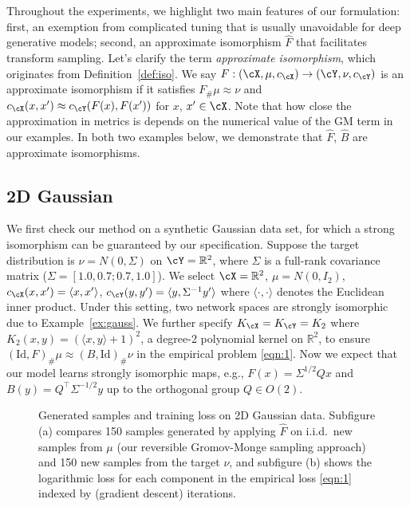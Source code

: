\documentclass[11pt]{article}
\begin{document}
Throughout the experiments, we highlight two main features of our formulation: first, an exemption from complicated tuning that is usually unavoidable for deep generative models; second, an approximate isomorphism  $\widehat{F}$ that facilitates transform sampling. Let's clarify the term \textit{approximate isomorphism}, which originates from Definition~\ref{def:iso}.
We say ${F}: (\cX, \mu, c_\cX) \to (\cY, \nu, c_\cY)$ is an approximate isomorphism if it
satisfies ${F}_\#\mu\approx \nu$ and
$c_\cX(x, x^\prime)\approx c_\cY({F}(x), {F}(x^\prime))$ for $x$, $x^\prime\in\cX$. 
Note that how close the approximation in metrics is depends on the numerical value of the GM term in our examples.
In both two examples below, we demonstrate that $\widehat{F}$, $\widehat{B}$ are approximate isomorphisms. 



\subsection{2D Gaussian}

We first check our method on a synthetic Gaussian data set, for which a strong isomorphism can be guaranteed by our specification. Suppose
the target distribution is $\nu = N(0, \Sigma)$ on $\cY = \mathbb{R}^2$, where $\Sigma$ is a full-rank covariance matrix ($\Sigma = [1.0, 0.7;0.7, 1.0]$).
We select
$\cX = \mathbb{R}^2$, $\mu = N(0, I_2)$,
$c_\cX(x, x^\prime) = \langle x, x^\prime\rangle$,
$c_\cY(y, y^\prime) =  \langle y, \Sigma^{-1} y^\prime\rangle$
where $\langle\cdot, \cdot\rangle$ denotes the Euclidean inner product. 
Under this setting, two network spaces are strongly isomorphic due to Example~\ref{ex:gauss}. 
We further specify $K_\cX = K_\cY = K_2$
where $K_2(x, y) = (\langle x, y\rangle + 1)^2$, a degree-2 polynomial kernel on $\mathbb{R}^2$, to ensure
$(\mathrm{Id}, F)_{\#}\mu \approx (B, \mathrm{Id})_{\#} \nu$ in the
empirical problem \eqref{eqn:1}. 
Now we expect that our model learns 
strongly isomorphic maps, e.g., ${F}(x) = \Sigma^{1/2} Qx$ and ${B}(y) = Q^{\top}\Sigma^{-1/2}y$ up to the orthogonal group $Q \in O(2)$.

\begin{figure}[ht]
    \centering
    \qquad
    \caption{Generated samples and training loss on 2D Gaussian data. Subfigure (a) compares 150 samples generated by applying $\widehat{F}$ on i.i.d.\ new samples from $\mu$ (our reversible Gromov-Monge sampling approach) and 150 new samples from the target $\nu$, and subfigure (b) shows the logarithmic loss for each component in the empirical loss \eqref{eqn:1} indexed by (gradient descent) iterations. }
    \label{fig:gauss}
\end{figure}
\end{document}
